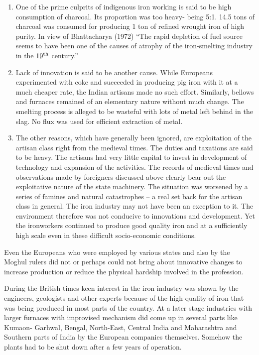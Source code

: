 \begin{enumerate}
\item One of the prime culprits of indigenous iron working is said to be high consumption of charcoal. Its proportion was too heavy- being 5:1. 14.5 tons of charcoal was consumed for producing 1 ton of refined wrought iron of high purity. In view of Bhattacharya (1972) “The rapid depletion of fuel source seems to have been one of the causes of atrophy of the iron-smelting industry in the $19^{\rm th}$ century.”
\item Lack of innovation is said to be another cause. While Europeans experimented with coke and succeeded in producing pig iron with it at a much cheaper rate, the Indian artisans made no such effort. Similarly, bellows and furnaces remained of an elementary nature without much change. The smelting process is alleged to be wasteful with lots of metal left behind in the slag. No flux was used for efficient extraction of metal.
\item The other reasons, which have generally been ignored, are exploitation of the artisan class right from the medieval times. The duties and taxations are said to be heavy. The artisans had very little capital to invest in development of technology and expansion of the activities. The records of medieval times and observations made by foreigners discussed above clearly bear out the exploitative nature of the state machinery. The situation was worsened by a series of famines and natural catastrophes – a real set back for the artisan class in general. The iron industry may not have been an exception to it. The environment therefore was not conducive to innovations and development. Yet the ironworkers continued to produce good quality iron and at a sufficiently high scale even in these difficult socio-economic conditions.
\end{enumerate}

Even the Europeans who were employed by various states and also by the Moghul rulers did not or perhaps could not bring about innovative changes to increase production or reduce the physical hardship involved in the profession. 

During the British times keen interest in the iron industry was shown by the engineers, geologists and other experts because of the high quality of iron that was being produced in most parts of the country. At a later stage industries with larger furnaces with improvised mechanism did come up in several parts like Kumaon- Garhwal, Bengal, North-East, Central India and Maharashtra and Southern parts of India by the European companies themselves. Somehow the plants had to be shut down after a few years of operation. 

